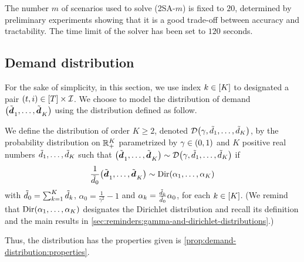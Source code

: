 The number $m$ of scenarios used to solve (2SA-$m$) is fixed to $20$, determined by preliminary experiments showing that it is a good trade-off between accuracy and tractability.
The time limit of the solver has been set to $120$ seconds.











\subsection{Demand distribution}
\label{sec:PDP:numerical-experiments:drawing-realization-of-demand}


For the sake of simplicity, in this section, we use index $k\in\range{K}$ to designated a pair $(t,i)\in\range{\horizon}\times\REF$.
We choose to model the distribution of demand $\bracket{\tilde{\va\demand}_1,\ldots,\tilde{\va\demand}_K}$ using the \distrib distribution defined as follow.


We define the \distrib distribution of order $K\ge2$, denoted $\cD\bracket{\gamma,\tilde{\demand}_1,\ldots,\tilde{\demand}_K}$, by the probability distribution on $\mathbb{R}_+^K$ parametrized by $\gamma\in\bracket{0,1}$ and $K$ positive real numbers $\tilde{d}_1,\ldots,\tilde{d}_K$ such that $\bracket{\tilde{\va\demand}_1,\ldots,\tilde{\va\demand}_K}\sim\cD\bracket{\gamma,\tilde{\demand}_1,\ldots,\tilde{\demand}_K}$ if 
\begin{equation}
  \frac{1}{\tilde{\demand}_0}\bracket{\tilde{\va\demand}_1,\ldots,\tilde{\va\demand}_K}\sim\Dir\bracket{\alpha_1,\ldots,\alpha_K}
\end{equation}
with $\tilde{d}_0=\sum_{k=1}^K\tilde{d}_k$, $\alpha_0=\frac{1}{\gamma^2}-1$ and $\alpha_k=\frac{\tilde{d}_k}{\tilde{d}_0}\alpha_0$, for each $k\in\range{K}$.
(We remind that $\Dir\bracket{\alpha_1,\ldots,\alpha_K}$ designates the Dirichlet distribution and recall its definition and the main results in \cref{sec:reminders:gamma-and-dirichlet-distributions}.)


Thus, the \distrib distribution has the properties given is \cref{prop:demand-distribution:properties}.


